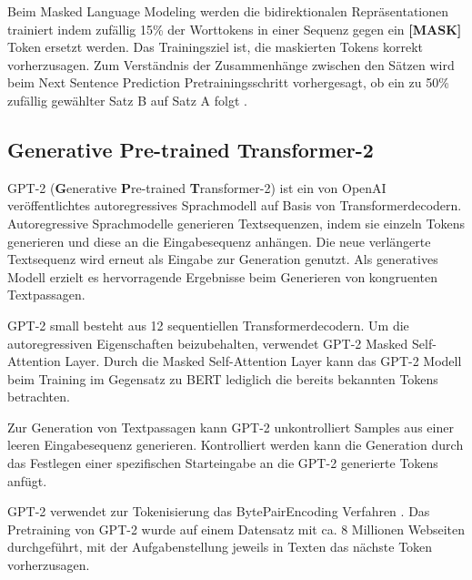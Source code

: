 Beim Masked Language Modeling werden die bidirektionalen Repräsentationen trainiert indem zufällig 15\% der Worttokens in einer Sequenz gegen ein \textbf{[MASK]} Token ersetzt werden. Das Trainingsziel ist, die maskierten Tokens korrekt vorherzusagen.
Zum Verständnis der Zusammenhänge zwischen den Sätzen wird beim Next Sentence Prediction Pretrainingsschritt vorhergesagt, ob ein zu 50\% zufällig gewählter Satz B auf Satz A folgt \citep{DBLP:journals/corr/abs-1810-04805}.

\subsection{\textbf{G}enerative \textbf{P}re-trained \textbf{T}ransformer-2}
GPT-2 (\textbf{G}enerative \textbf{P}re-trained \textbf{T}ransformer-2) ist ein von OpenAI \citep{radford2019language} veröffentlichtes autoregressives Sprachmodell auf Basis von Transformerdecodern.
Autoregressive Sprachmodelle generieren Textsequenzen, indem sie einzeln Tokens generieren und diese an die Eingabesequenz anhängen. Die neue verlängerte Textsequenz wird erneut als Eingabe zur Generation genutzt.
Als generatives Modell erzielt es hervorragende Ergebnisse beim Generieren von kongruenten Textpassagen.

GPT-2 small besteht aus 12 sequentiellen Transformerdecodern.
Um die autoregressiven Eigenschaften beizubehalten, verwendet GPT-2 Masked Self-Attention Layer. 
Durch die Masked Self-Attention Layer kann das GPT-2 Modell beim Training im Gegensatz zu BERT lediglich die bereits bekannten Tokens betrachten.

Zur Generation von Textpassagen kann GPT-2 unkontrolliert Samples aus einer leeren Eingabesequenz generieren.
Kontrolliert werden kann die Generation durch das Festlegen einer spezifischen Starteingabe an die GPT-2 generierte Tokens anfügt.

GPT-2 verwendet zur Tokenisierung das BytePairEncoding Verfahren \citep{bytepairencoding}.
Das Pretraining von GPT-2 wurde auf einem Datensatz mit ca. 8 Millionen Webseiten durchgeführt, mit der Aufgabenstellung jeweils in Texten das nächste Token vorherzusagen.



\pagebreak
